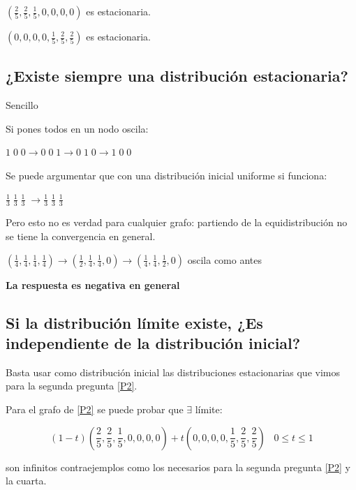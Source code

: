 $(\frac{2}{5},\frac{2}{5},\frac{1}{5}, 0, 0 , 0, 0)$ es estacionaria.

$(0, 0, 0, 0, \frac{1}{5}, \frac{2}{5}, \frac{2}{5})$ es estacionaria.


\subsection{¿Existe siempre una distribución estacionaria?}

\begin{example}{Sencillo}

	\begin{center}
		\centering
	\end{center}

	Si pones todos en un nodo oscila:

	$1\; 0\; 0 \rightarrow 0\; 0\; 1 \rightarrow 0\; 1\; 0 \rightarrow 1\; 0\; 0$

	Se puede argumentar que con una distribución inicial uniforme si funciona:

	$\frac{1}{3} \; \frac{1}{3} \; \frac{1}{3} \; \rightarrow \frac{1}{3} \; \frac{1}{3} \; \frac{1}{3} \; $

	Pero esto no es verdad para cualquier grafo: partiendo de la equidistribución no se tiene la convergencia en general.

	\begin{center}
		\centering
	\end{center}


	$(\frac{1}{4},\frac{1}{4},\frac{1}{4},\frac{1}{4}) \rightarrow (\frac{1}{2},\frac{1}{4},\frac{1}{4}, 0) \rightarrow (\frac{1}{4},\frac{1}{4},\frac{1}{2},0)$ oscila como antes

	\textbf{La respuesta es negativa en general}

\end{example}


\subsection {Si la distribución límite existe, ¿Es independiente de la distribución inicial?}


Basta usar como distribución inicial las distribuciones estacionarias que vimos para la segunda pregunta \ref{P2}.

\begin{obs}

Para el grafo de \ref{P2} se puede probar que $\exists$ límite:

$$(1-t)(\frac{2}{5},\frac{2}{5},\frac{1}{5},0,0,0,0) + t (0,0,0,0,\frac{1}{5},\frac{2}{5},\frac{2}{5}) \;\;\; 0 \leq t \leq 1 $$

son infinitos contraejemplos como los necesarios para la segunda pregunta \ref{P2} y la cuarta.

\end{obs}


